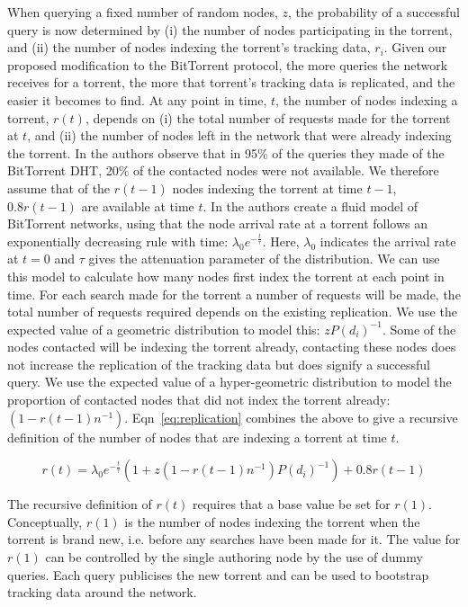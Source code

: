     When querying a fixed number of random nodes, $z$, the probability of a successful query is now determined by (i) the number of nodes participating in the torrent, and (ii) the number of nodes indexing the torrent's tracking data, $r_i$. Given our proposed modification to the BitTorrent protocol, the more queries the network receives for a torrent, the more that torrent's tracking data is replicated, and the easier it becomes to find. At any point in time, $t$, the number of nodes indexing a torrent, $r(t)$, depends on (i) the total number of requests made for the torrent at $t$, and (ii) the number of nodes left in the network that were already indexing the torrent. In \cite{Crosby2007} the authors observe that in 95\% of the queries they made of the BitTorrent DHT, 20\% of the contacted nodes were not available. We therefore assume that of the $r(t-1)$ nodes indexing the torrent at time $t-1$, $0.8r(t-1)$ are available at time $t$. In \cite{Guo2007} the authors create a fluid model of BitTorrent networks, using that the node arrival rate at a torrent follows an exponentially decreasing rule with time: $\lambda_0e^{-\frac{t}{\tau}}$. Here, $\lambda_0$ indicates the arrival rate at $t=0$ and $\tau$ gives the attenuation parameter of the distribution. We can use this model to calculate how many nodes first index the torrent at each point in time. For each search made for the torrent a number of requests will be made, the total number of requests required depends on the existing replication. We use the expected value of a geometric distribution to model this: $zP(d_i)^{-1}$. Some of the nodes contacted will be indexing the torrent already, contacting these nodes does not increase the replication of the tracking data but does signify a successful query. We use the expected value of a hyper-geometric distribution to model the proportion of contacted nodes that did not index the torrent already: $(1-r(t-1)n^{-1})$. Eqn~\ref{eq:replication} combines the above to give a recursive definition of the number of nodes that are indexing a torrent at time $t$.

    \begin{equation}
        r(t) = \lambda_0e^{-\frac{t}{\tau}}(1 + z(1-r(t-1)n^{-1})P(d_i)^{-1})+0.8r(t-1)
        \label{eq:replication}
    \end{equation}

    The recursive definition of $r(t)$ requires that a base value be set for $r(1)$. Conceptually, $r(1)$ is the number of nodes indexing the torrent when the torrent is brand new, i.e. before any searches have been made for it. The value for $r(1)$ can be controlled by the single authoring node by the use of dummy queries. Each query publicises the new torrent and can be used to bootstrap tracking data around the network.

